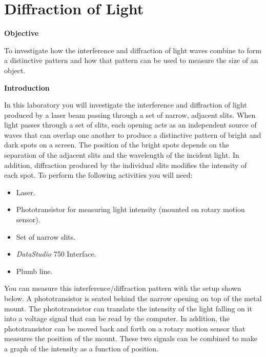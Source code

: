 
\section{Diffraction of Light}

\makelabheader %

\textbf{Objective}

To investigate how the interference and diffraction of light waves
combine to form a distinctive pattern and how that pattern can be
used to measure the size of an object.

\textbf{Introduction}

In this laboratory you will investigate the interference and diffraction
of light produced by a laser beam passing through a set of narrow,
adjacent slits. When light passes through a set of slits, each opening
acts as an independent source of waves that can overlap one another
to produce a distinctive pattern of bright and dark spots on a screen.
The position of the bright spots depends on the separation of the
adjacent slits and the wavelength of the incident light. In addition,
diffraction produced by the individual slits modifies the intensity
of each spot. To perform the following activities you will need:

\begin{itemize}
\item Laser.
\item Phototransistor for measuring light intensity (mounted on rotary motion sensor).
\item Set of narrow slits.
\item {\it DataStudio} 750 Interface.
\item Plumb line.
\end{itemize}
You can measure this interference/diffraction pattern with the setup
shown below. A phototransistor is seated behind the narrow opening on top
of the metal mount. The phototransistor can translate the intensity
of the light falling on it into a voltage signal that can be read
by the computer. In addition, the phototransistor can be moved back and
forth on a rotary motion sensor that measures the position of the 
mount.
These two signals can be combined to
make a graph of the intensity as a function of position.

